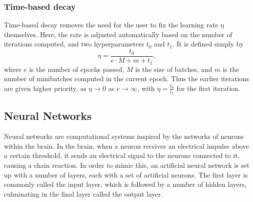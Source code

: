 \documentclass{article}
\theoremstyle{definition}
\begin{document}
\subsubsection{Time-based decay}
Time-based decay removes the need for the user to fix the learning rate $\eta$ themselves. Here, the rate is adjusted automatically based on the number of iterations computed, and two hyperparameters $t_0$ and $t_1$. It is defined simply by
\begin{equation}\label{eq:TimeDecay}
    \eta = \frac{t_0}{e \cdot M + m + t_1},
\end{equation}
where $e$ is the number of epochs passed, $M$ is the size of batches, and $m$ is the number of minibatches computed in the current epoch. Thus the earlier iterations are given higher priority, as $\eta \to 0$ as $e \to \infty$, with $\eta = \frac{t_0}{t_1}$ for the first iteration.

\subsection{Neural Networks}
Neural networks are computational systems inspired by the networks of neurons within the brain. In the brain, when a neuron receives an electrical impulse above a certain threshold, it sends an electrical signal to the neurons connected to it, causing a chain reaction. In order to mimic this, an artificial neural network is set up with a number of layers, each with a set of artificial neurons. The first layer is commonly called the input layer, which is followed by a number of hidden layers, culminating in the final layer called the output layer.
\end{document}

